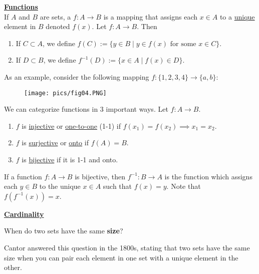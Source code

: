 

\noindent \underline{\textbf{Functions}} \\
If $A$ and $B$ are sets, a  $f:A\to B$ is a mapping that assigns each $x\in A$ to a \underline{unique} element in $B$ denoted $f(x)$. Let $f:A\to B$. Then
\begin{enumerate}
    \item If $C\subset A$, we define $f(C) := \{y\in B \mid y\in f(x)\text{~for some~} x\in C\}$.
    \item If $D\subset B$, we define $f^{-1}(D) := \{x\in A\mid f(x) \in D\}$.
\end{enumerate}

As an example, consider the following mapping $f:\{1,2,3,4\}\to \{a,b\}$:
\begin{figure}[h]
    \centering
    \texttt{[image: pics/fig04.PNG]}
\end{figure}

\noindent We can categorize functions in 3 important ways. Let $f:A\to B$.
\begin{enumerate}
    \item $f$ is \underline{injective} or \underline{one-to-one} (1-1) if $f(x_1) = f(x_2) \implies x_1 = x_2$.
    \item $f$ is \underline{surjective} or \underline{onto} if $f(A) = B$. 
    \item $f$ is \underline{bijective} if it is 1-1 and onto.
\end{enumerate}
If a function $f:A\to B$ is bijective, then $f^{-1}:B\to A$ is the function which assigns each $y\in B$ to the unique $x\in A$ such that $f(x) = y$. Note that $f(f^{-1}(x)) = x$.

\noindent \underline{\textbf{Cardinality}}

\begin{question}
When do two sets have the same \textbf{size}?
\end{question}
Cantor answered this question in the 1800s, stating that two sets have the same size when you can pair each element in one set with a unique element in the other. 

